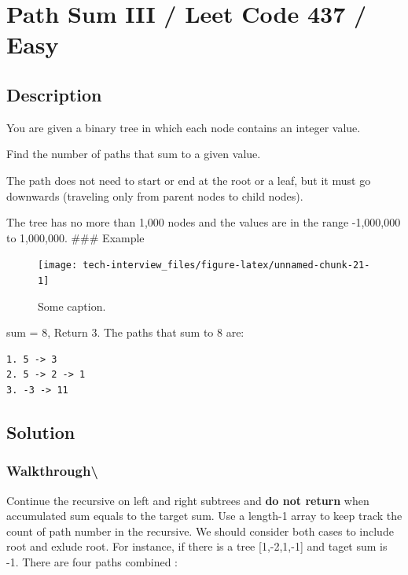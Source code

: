 \documentclass[]{book}
\begin{document}
\hypertarget{path-sum-iii-leet-code-437-easy}{%
\section{Path Sum III / Leet Code 437 / Easy}\label{path-sum-iii-leet-code-437-easy}}

\hypertarget{description-61}{%
\subsection{Description}\label{description-61}}

You are given a binary tree in which each node contains an integer value.

Find the number of paths that sum to a given value.

The path does not need to start or end at the root or a leaf, but it must go downwards (traveling only from parent nodes to child nodes).

The tree has no more than 1,000 nodes and the values are in the range -1,000,000 to 1,000,000.
\#\#\# Example

\begin{figure}
\texttt{[image: tech-interview\_files/figure-latex/unnamed-chunk-21-1]} \caption{Some caption.}\label{fig:unnamed-chunk-21}
\end{figure}

sum = 8, Return 3. The paths that sum to 8 are:

\begin{verbatim}
1. 5 -> 3
2. 5 -> 2 -> 1
3. -3 -> 11
\end{verbatim}

\hypertarget{solution-43}{%
\subsection{Solution}\label{solution-43}}

\hypertarget{walkthrough-65}{%
\subsubsection{Walkthrough\textbackslash{}}\label{walkthrough-65}}

Continue the recursive on left and right subtrees and \textbf{do not return} when accumulated sum equals to the
target sum. Use a length-1 array to keep track the count of path number in the recursive. We should consider both
cases to include root and exlude root. For instance, if there is a tree {[}1,-2,1,-1{]} and taget sum is -1. There
are four paths combined :
\end{document}

